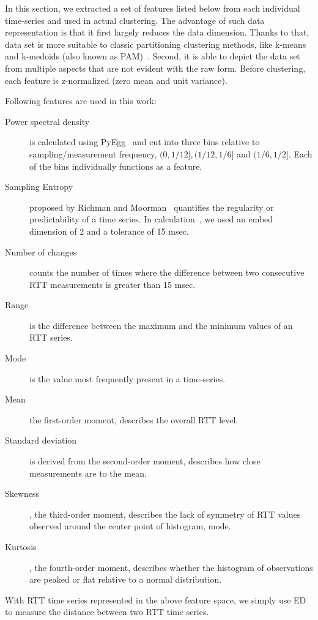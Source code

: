 In this section, we extracted a set of features listed below from each individual time-series and used in actual clustering. 
The advantage of such data representation is that it first largely reduces the data dimension. Thanks to that, data set is more suitable to classic partitioning clustering methods, like k-means and k-medoids (also known as \acf{PAM})~\cite{Lin2003}.
Second, it is able to depict the data set from multiple aspects that are not evident with the raw form. 
Before clustering, each feature is z-normalized (zero mean and unit variance).

Following features are used in this work:
\begin{description}
\item[Power spectral density] is calculated using PyEgg~\cite{Bao2011} and cut into three bins relative to sampling/measurement frequency, $(0, 1/12], (1/12, 1/6]$ and $(1/6, 1/2]$. Each of the bins individually functions as a feature.
\item[Sampling Entropy] proposed by Richman and Moorman~\cite{Richman2000} quantifies the regularity or predictability of a time series. In calculation~\cite{Bao2011}, we used an embed dimension of 2 and a tolerance of 15 msec.
\item[Number of changes] counts the number of times where the difference between two consecutive RTT measurements is greater than 15 msec. %
\item[Range] is the difference between the maximum and the minimum values of an RTT series.
\item[Mode] is the value most frequently present in a time-series.
\item[Mean] the first-order moment, describes the overall RTT level.
\item[Standard deviation] is derived from the second-order moment, describes how close measurements are to the mean.
\item[Skewness], the third-order moment, describes the lack of symmetry of RTT values observed around the center point of histogram, mode.
\item[Kurtosis], the fourth-order moment, describes whether the histogram of observations are peaked or flat relative to a normal distribution.
\end{description}
With RTT time series represented in the above feature space, we simply use \acf{ED} to measure the distance between two RTT time series.

